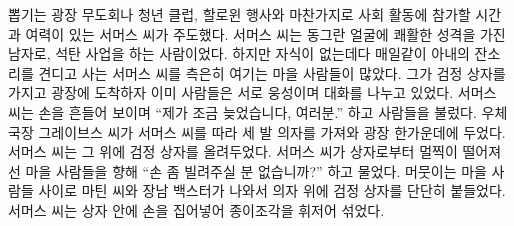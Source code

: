 \documentclass{translation}
\begin{document}
뽑기는 광장 무도회나 청년 클럽, 할로윈 행사와 마찬가지로 사회 활동에 참가할 시간과 여력이 있는 서머스 씨가 주도했다.
서머스 씨는 동그란 얼굴에 쾌활한 성격을 가진 남자로, 석탄 사업을 하는 사람이었다.
하지만 자식이 없는데다 매일같이 아내의 잔소리를 견디고 사는 서머스 씨를 측은히 여기는 마을 사람들이 많았다.
그가 검정 상자를 가지고 광장에 도착하자 이미 사람들은 서로 웅성이며 대화를 나누고 있었다.
서머스 씨는 손을 흔들어 보이며 ``제가 조금 늦었습니다, 여러분.'' 하고 사람들을 불렀다.
우체국장 그레이브스 씨가 서머스 씨를 따라 세 발 의자를 가져와 광장 한가운데에 두었다.
서머스 씨는 그 위에 검정 상자를 올려두었다.
서머스 씨가 상자로부터 멀찍이 떨어져 선 마을 사람들을 향해 ``손 좀 빌려주실 분 없습니까?'' 하고 물었다.
머뭇이는 마을 사람들 사이로 마틴 씨와 장남 백스터가 나와서 의자 위에 검정 상자를 단단히 붙들었다.
서머스 씨는 상자 안에 손을 집어넣어 종이조각을 휘저어 섞었다.
% 
\end{document}
